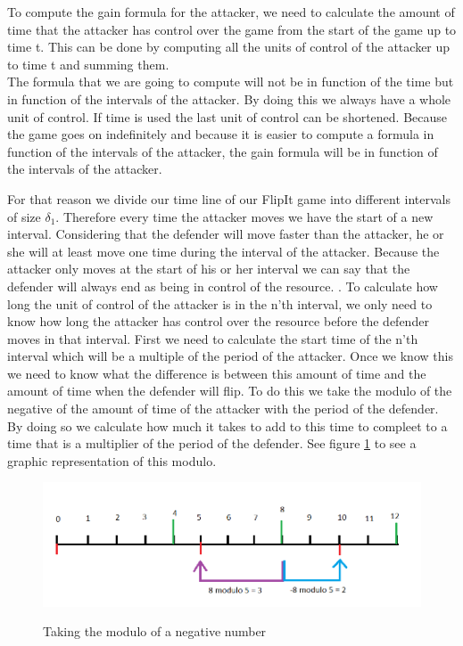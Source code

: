 To compute the gain formula for the attacker, we need to calculate the amount of time that the attacker has control over the game from the start of the game up to time t. This can be done by computing all the units of control of the attacker up to time t  and summing them. \\
The formula that we are going to compute will not be in function of the time but in function of the intervals of the attacker. By doing this we always have a whole unit of control. If time is used the last unit of control can be shortened. Because the game goes on indefinitely and because it is easier to compute a formula in function of the intervals of the attacker, the gain formula will be in function of the intervals of the attacker. 

For that reason we divide our time line of our FlipIt game into different intervals of size $\delta_{1}$. Therefore every time the attacker moves we have the start of a new interval. Considering that the defender will move faster than the attacker, he or she will at least move one time during the interval of the attacker. Because the attacker only moves at the start of his or her interval we can say that the defender will always end as being in control of the resource. . To calculate how long the unit of control of the attacker is in the n'th interval, we only need to know how long the attacker has control over the resource before the defender moves in that interval. First we need to calculate the start time of the n'th interval which will be a multiple of the period of the attacker. Once we know this we need to know what the difference is between this amount of time and the amount of time when the defender will flip. To do this we take the modulo of the negative of the amount of time of the attacker with the period of the defender. By doing so we calculate how much it takes to add to this time to compleet to a time that is a multiplier of the period of the defender. See figure \ref{fig:modulo} to see a graphic representation of this modulo. 
\begin{figure}[hbtp]
\caption{Taking the modulo of a negative number}
\centering
\includegraphics[scale=0.6]{Images/Modulo.png}
\label{fig:modulo}
\end{figure}

